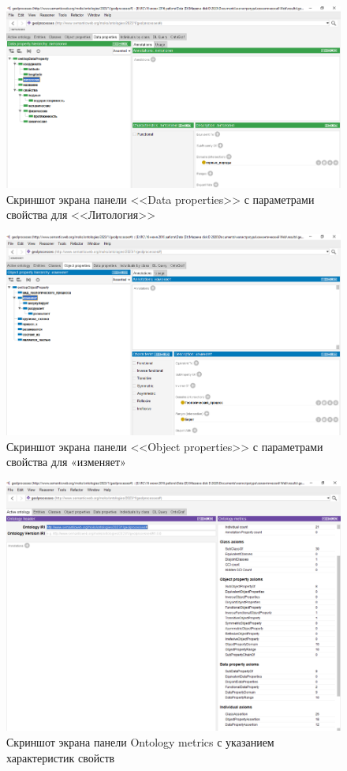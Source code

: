 \documentclass[732,fontsize=14pt,final]{studrep}
\begin{document}
  \begin{figure}[htp]
	\centering
	\includegraphics[width=0.9\linewidth]{pics/image24.png}
    \caption{Скриншот экрана панели <<Data properties>> с параметрами свойства для <<Литология>>}
    \label{fig:data-props}
  \end{figure}

  \begin{figure}[htp]
	\centering
	\includegraphics[width=0.9\linewidth]{pics/image10.png}
    \caption{Скриншот экрана панели <<Object properties>> с параметрами свойства для «изменяет»}
    \label{fig:obj-props}
  \end{figure}

  \begin{figure}[htp]
	\centering
	\includegraphics[width=0.9\linewidth]{pics/image19.png}
    \caption{Скриншот экрана панели Ontology metrics с указанием характеристик свойств}
    \label{fig:onto-metrics}
  \end{figure}
\end{document}
